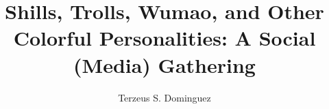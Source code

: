 \usepackage[a4paper, margin=1in]{geometry}
\usepackage{authblk}
\usepackage{fontspec}
\usepackage{xeCJK}
\usepackage{setspace}
\usepackage{scrextend}
\usepackage{ragged2e}
\usepackage[american]{babel}
\usepackage[page]{appendix}
\usepackage[inline]{enumitem}


\usepackage[style=apa,backend=biber]{biblatex}

\usepackage{csquotes}

%

\usepackage{comment}


\setmainfont[Ligatures=TeX]{Charis SIL}
\setsansfont[Ligatures=TeX]{OpenSans}
\setmonofont{Inconsolata}
\usepackage{microtype}
\title{Shills, Trolls, Wumao, and Other Colorful Personalities: A Social
(Media) Gathering}
\author{Terzeus S. Dominguez}
\date{}

